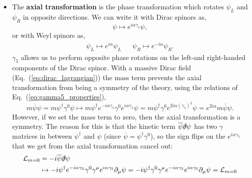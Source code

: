 \documentclass[12pt, oneside]{article}   	%
\theoremstyle{definition}
\begin{document}
\begin{itemize}
	\item The \textbf{axial transformation} is the phase transformation which rotates $\psi_L$ and $\psi_R$ in opposite directions. We can write it with Dirac spinors as,
	\begin{equation}
		\psi\mapsto e^{i\alpha\gamma_5} \psi, \label{eq:axial_transformation}
	\end{equation}
	or with Weyl spinors as,
	\begin{align}
		\psi_L\mapsto e^{i\alpha} \psi_L && \psi_R\mapsto e^{-i\alpha}\psi_R.
	\end{align}
	$\gamma_5$ allows us to perform opposite phase rotations on the left-and right-handed components of the Dirac spinor. With a massive Dirac field (Eq.~(\ref{eq:dirac_lagrangian})) the mass term prevents the axial transformation from being a symmetry of the theory, using the relations of Eq.~(\ref{eq:gamma5_properties}), 
	\begin{equation}
		m\overline\psi\psi = m \psi^\dagger\gamma^0 \psi \mapsto m \psi^\dagger e^{-i \alpha \gamma_5} \gamma^0 e^{i\alpha\gamma_5} \psi = m\psi^\dagger \gamma^0 e^{2i\alpha(\gamma_5)^2} \psi = e^{2i\alpha} m\overline{\psi} \psi.
	\end{equation}
	However, if we set the mass term to zero, then the axial transformation is a symmetry. The reason for this is that the kinetic term $\overline\psi \slashed \partial \psi$ has two $\gamma$ matrices in between $\psi^\dagger$ and $\psi$ (since $\overline\psi = \psi^\dagger\gamma^0$), so the sign flips on the $e^{i\alpha\gamma_5}$ that we get from the axial transformation cancel out:
	\begin{align}\begin{split}
		\mathcal L_{m=0} &= -i\overline{\psi} \slashed\partial \psi \\ 
		&\mapsto -i \psi^\dagger e^{-i\alpha\gamma_5} \gamma^0 \gamma^\mu e^{i\alpha\gamma_5} \partial_\mu \psi = -i\psi^\dagger\gamma^0\gamma^\mu e^{-i\alpha\gamma_5} e^{i\alpha\gamma_5} \partial_\mu\psi = \mathcal L_{m = 0}
	\end{split}\end{align}
	

\end{itemize}
\end{document}

